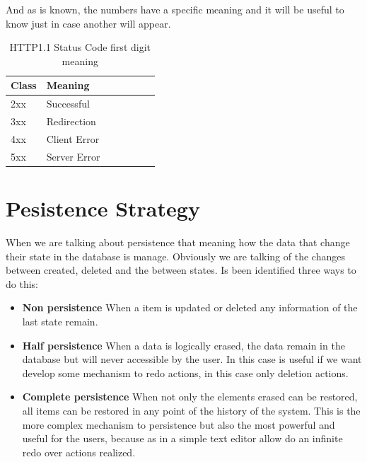 \noindent And as is known, the numbers have a specific meaning and it will
be useful to know just in case another will appear.

\begin{table}[H]
\centering

\begin{tabular}{@{}lllllll@{}}

Class & Meaning\\
\midrule

2xx & Successful\\
3xx & Redirection\\
4xx & Client Error\\
5xx & Server Error\\

\end{tabular}
\caption{HTTP1.1 Status Code first digit meaning}
\label{my-label}
\end{table}


\section{Pesistence Strategy}

When we are talking about persistence that meaning how the data that change
their state in the database is manage. Obviously we are talking of the changes
between created, deleted and the between states.
\intro
Is been identified three ways to do this:

\begin{itemize}
  \setlength{\itemsep}{0pt}
\item \textbf{Non persistence}
      \intro
      When a item is updated or deleted any information of the last state remain.
      \intro
\item \textbf{Half persistence}
      \intro
      When a data is logically erased, the data remain in the database but will never
      accessible by the user. In this case is useful if we want develop some mechanism
      to redo actions, in this case only deletion actions.
      \intro
\item \textbf{Complete persistence}
      \intro
      When not only the elements erased can be restored, all items can be restored in
      any point of the history of the system. This is the more complex mechanism to persistence
      but also the most powerful and useful for the users, because as in a simple
      text editor allow do an infinite redo over actions realized.

\end{itemize}

